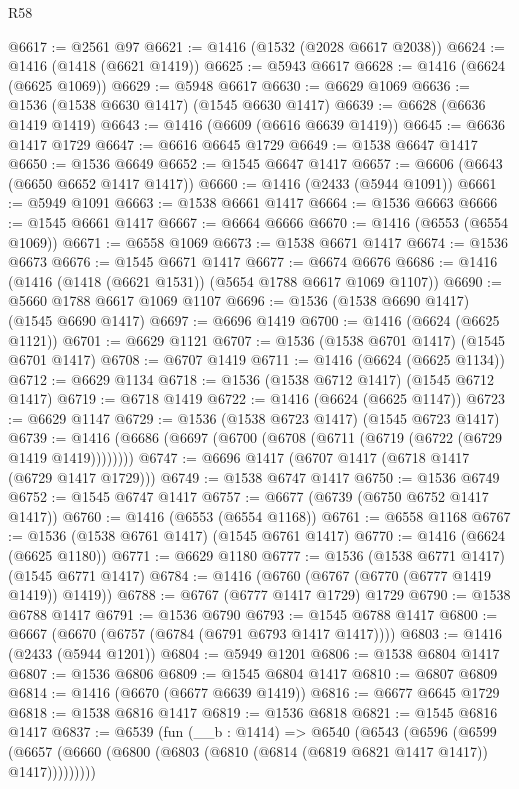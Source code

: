 \begin{lexlean}{R58}
\begin{coremodule}
{{@6617 := @2561 @97
@6621 := @1416 (@1532 (@2028 @6617 @2038))
@6624 := @1416 (@1418 (@6621 @1419))
@6625 := @5943 @6617
@6628 := @1416 (@6624 (@6625 @1069))
@6629 := @5948 @6617
@6630 := @6629 @1069
@6636 := @1536 (@1538 @6630 @1417) (@1545 @6630 @1417)
@6639 := @6628 (@6636 @1419 @1419)
@6643 := @1416 (@6609 (@6616 @6639 @1419))
@6645 := @6636 @1417 @1729
@6647 := @6616 @6645 @1729
@6649 := @1538 @6647 @1417
@6650 := @1536 @6649
@6652 := @1545 @6647 @1417
@6657 := @6606 (@6643 (@6650 @6652 @1417 @1417))
@6660 := @1416 (@2433 (@5944 @1091))
@6661 := @5949 @1091
@6663 := @1538 @6661 @1417
@6664 := @1536 @6663
@6666 := @1545 @6661 @1417
@6667 := @6664 @6666
@6670 := @1416 (@6553 (@6554 @1069))
@6671 := @6558 @1069
@6673 := @1538 @6671 @1417
@6674 := @1536 @6673
@6676 := @1545 @6671 @1417
@6677 := @6674 @6676
@6686 := @1416 (@1416 (@1418 (@6621 @1531)) (@5654 @1788 @6617 @1069 @1107))
@6690 := @5660 @1788 @6617 @1069 @1107
@6696 := @1536 (@1538 @6690 @1417) (@1545 @6690 @1417)
@6697 := @6696 @1419
@6700 := @1416 (@6624 (@6625 @1121))
@6701 := @6629 @1121
@6707 := @1536 (@1538 @6701 @1417) (@1545 @6701 @1417)
@6708 := @6707 @1419
@6711 := @1416 (@6624 (@6625 @1134))
@6712 := @6629 @1134
@6718 := @1536 (@1538 @6712 @1417) (@1545 @6712 @1417)
@6719 := @6718 @1419
@6722 := @1416 (@6624 (@6625 @1147))
@6723 := @6629 @1147
@6729 := @1536 (@1538 @6723 @1417) (@1545 @6723 @1417)
@6739 := @1416 (@6686 (@6697 (@6700 (@6708 (@6711 (@6719 (@6722 (@6729 @1419 @1419))))))))
@6747 := @6696 @1417 (@6707 @1417 (@6718 @1417 (@6729 @1417 @1729)))
@6749 := @1538 @6747 @1417
@6750 := @1536 @6749
@6752 := @1545 @6747 @1417
@6757 := @6677 (@6739 (@6750 @6752 @1417 @1417))
@6760 := @1416 (@6553 (@6554 @1168))
@6761 := @6558 @1168
@6767 := @1536 (@1538 @6761 @1417) (@1545 @6761 @1417)
@6770 := @1416 (@6624 (@6625 @1180))
@6771 := @6629 @1180
@6777 := @1536 (@1538 @6771 @1417) (@1545 @6771 @1417)
@6784 := @1416 (@6760 (@6767 (@6770 (@6777 @1419 @1419)) @1419))
@6788 := @6767 (@6777 @1417 @1729) @1729
@6790 := @1538 @6788 @1417
@6791 := @1536 @6790
@6793 := @1545 @6788 @1417
@6800 := @6667 (@6670 (@6757 (@6784 (@6791 @6793 @1417 @1417))))
@6803 := @1416 (@2433 (@5944 @1201))
@6804 := @5949 @1201
@6806 := @1538 @6804 @1417
@6807 := @1536 @6806
@6809 := @1545 @6804 @1417
@6810 := @6807 @6809
@6814 := @1416 (@6670 (@6677 @6639 @1419))
@6816 := @6677 @6645 @1729
@6818 := @1538 @6816 @1417
@6819 := @1536 @6818
@6821 := @1545 @6816 @1417
@6837 := @6539
    (fun (__b : @1414) =>
    @6540
      (@6543
        (@6596
          (@6599 (@6657 (@6660 (@6800 (@6803 (@6810 (@6814 (@6819 @6821 @1417 @1417)) @1417)))))))))
}}
\end{coremodule}
\end{lexlean}
